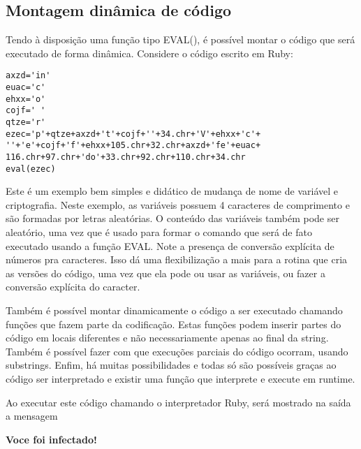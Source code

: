 \subsection{Montagem dinâmica de código}
Tendo à disposição uma função tipo EVAL(), é possível montar o código que será executado de forma dinâmica. Considere o código escrito em Ruby:


{{{
\renewcommand{\baselinestretch}{1.0}
\begin{verbatim}
axzd='in'
euac='c'
ehxx='o'
cojf=' '
qtze='r'
ezec='p'+qtze+axzd+'t'+cojf+''+34.chr+'V'+ehxx+'c'+
''+'e'+cojf+'f'+ehxx+105.chr+32.chr+axzd+'fe'+euac+
116.chr+97.chr+'do'+33.chr+92.chr+110.chr+34.chr
eval(ezec)
\end{verbatim}
}}}

Este é um exemplo bem simples e didático de mudança de nome de variável e criptografia. Neste exemplo, as variáveis possuem 4 caracteres de comprimento e são formadas por letras aleatórias. O conteúdo das variáveis também pode ser aleatório, uma vez que é usado para formar o comando que será de fato executado usando a função EVAL. Note a presença de conversão explícita de números pra caracteres. Isso dá uma flexibilização a mais para a rotina que cria as versões do código, uma vez que ela pode ou usar as variáveis, ou fazer a conversão explícita do caracter.

Também é possível montar dinamicamente o código a ser executado chamando funções que fazem parte da codificação. Estas funções podem inserir partes do código em locais diferentes e não necessariamente apenas ao final da string. Também é possível fazer com que execuções parciais do código ocorram, usando substrings. Enfim, há muitas possibilidades e todas só são possíveis graças ao código ser interpretado e existir uma função que interprete e execute em runtime.

Ao executar este código chamando o interpretador Ruby, será mostrado na saída a mensagem

\textbf{Voce foi infectado!}